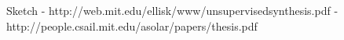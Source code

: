 Sketch
- http://web.mit.edu/ellisk/www/unsupervisedsynthesis.pdf
- http://people.csail.mit.edu/asolar/papers/thesis.pdf